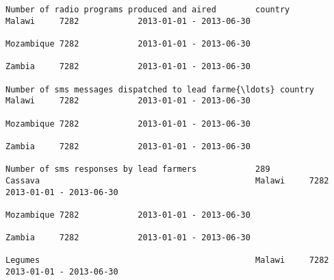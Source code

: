 \documentclass[11pt]{article}
\begin{document}
\begin{Verbatim}[commandchars=\\\{\}]
                                                                         Number of radio programs produced and aired        country                                                                              Malawi     7282            2013-01-01 - 2013-06-30   
                                                                                                                                                                                                                 Mozambique 7282            2013-01-01 - 2013-06-30   
                                                                                                                                                                                                                 Zambia     7282            2013-01-01 - 2013-06-30   
                                                                         Number of sms messages dispatched to lead farme{\ldots} country                                                                              Malawi     7282            2013-01-01 - 2013-06-30   
                                                                                                                                                                                                                 Mozambique 7282            2013-01-01 - 2013-06-30   
                                                                                                                                                                                                                 Zambia     7282            2013-01-01 - 2013-06-30   
                                                                         Number of sms responses by lead farmers            289                               Cassava                                            Malawi     7282            2013-01-01 - 2013-06-30   
                                                                                                                                                                                                                 Mozambique 7282            2013-01-01 - 2013-06-30   
                                                                                                                                                                                                                 Zambia     7282            2013-01-01 - 2013-06-30   
                                                                                                                                                              Legumes                                            Malawi     7282            2013-01-01 - 2013-06-30   

\end{Verbatim}
\end{document}
